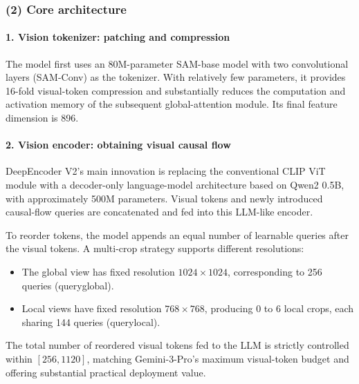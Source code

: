 \hypertarget{core-architecture}{%
\subsubsection{(2) Core architecture}\label{core-architecture}}

\hypertarget{vision-tokenizer-patching-and-compression}{%
\paragraph{1. Vision tokenizer: patching and compression}\label{vision-tokenizer-patching-and-compression}}

The model first uses an 80M-parameter SAM-base model with two convolutional layers (SAM-Conv) as the tokenizer. With relatively few parameters, it provides 16-fold visual-token compression and substantially reduces the computation and activation memory of the subsequent global-attention module. Its final feature dimension is 896.

\hypertarget{vision-encoder-obtaining-visual-causal-flow}{%
\paragraph{2. Vision encoder: obtaining visual causal flow}\label{vision-encoder-obtaining-visual-causal-flow}}

DeepEncoder V2's main innovation is replacing the conventional CLIP ViT module with a decoder-only language-model architecture based on Qwen2 0.5B, with approximately 500M parameters. Visual tokens and newly introduced causal-flow queries are concatenated and fed into this LLM-like encoder.

To reorder tokens, the model appends an equal number of learnable queries after the visual tokens. A multi-crop strategy supports different resolutions:

\begin{itemize}
\tightlist
\item
  The global view has fixed resolution \(1024\times1024\), corresponding to 256 queries (queryglobal).
\item
  Local views have fixed resolution \(768\times768\), producing 0 to 6 local crops, each sharing 144 queries (querylocal).
\end{itemize}

The total number of reordered visual tokens fed to the LLM is strictly controlled within \([256,1120]\), matching Gemini-3-Pro's maximum visual-token budget and offering substantial practical deployment value.

